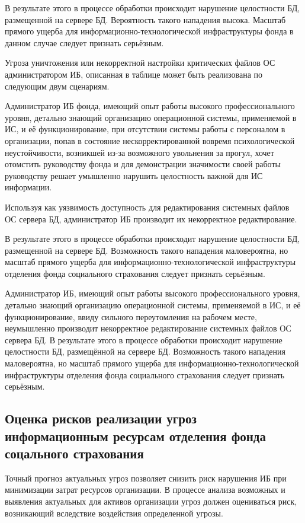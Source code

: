 В результате этого в процессе обработки происходит нарушение
целостности БД, размещенной на сервере БД. Вероятность такого
нападения высока. Масштаб прямого ущерба для
информацион\-но-технологической инфраструктуры фонда в данном случае
следует признать серьёзным.

\point Угроза уничтожения или некорректной настройки критических
файлов ОС администратором ИБ, описанная в таблице может быть
реализована по следующим двум сценариям.

\point Администратор ИБ фонда, имеющий опыт работы высокого
профессионального уровня, детально знающий организацию операционной
системы, применяемой в ИС, и её функционирование, при отсутствии
системы работы с персоналом в организации, попав в состояние
нескорректированной вовремя психологической неустойчивости, возникшей
из-за возможного увольнения за прогул, хочет отомстить руководству
фонда и для демонстрации значимости своей работы руководству решает
умышленно нарушить целостность важной для ИС информации.

Используя как уязвимость доступность для редактирования системных
файлов ОС сервера БД, администратор ИБ производит их некорректное
редактирование.

В результате этого в процессе обработки происходит нарушение
целостности БД, размещенной на сервере БД.  Возможность такого
нападения маловероятна, но масштаб прямого ущерба для
информационно-технологической инфраструктуры отделения фонда
социального страхования следует признать серьёзным.

\point Администратор ИБ, имеющий опыт работы высокого
профессионального уровня, детально знающий организацию операционной
системы, применяемой в ИС, и её функционирование, ввиду сильного
переутомления на рабочем месте, неумышленно производит некорректное
редактирование системных файлов ОС сервера БД.  В результате этого в
процессе обработки происходит нарушение целостности БД, размещённой на
сервере БД.  Возможность такого нападения маловероятна, но масштаб
прямого ущерба для информационно-технологической инфраструктуры
отделения фонда социального страхования следует признать серьёзным.

\subsection{Оценка рисков реализации угроз информационным ресурсам
  отделения фонда соцального страхования}

\point Точный прогноз актуальных угроз позволяет снизить риск
нарушения ИБ при минимизации затрат ресурсов организации. В процессе
анализа возможных и выявления актуальных для активов организации угроз
должен оцениваться риск, возникающий вследствие воздействия
определенной угрозы.

